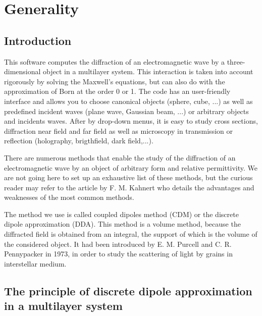 \chapter{Generality}\label{chap1}

\minitoc

\section{Introduction}


This software computes the diffraction of an electromagnetic wave by a
three-dimensional object in a multilayer system. This interaction is
taken into account rigorously by solving the Maxwell's equations, but
can also do with the approximation of Born at the order 0 or 1. The
code has an user-friendly interface and allows you to choose canonical
objects (sphere, cube, ...) as well as predefined incident waves
(plane wave, Gaussian beam, ...) or arbitrary objects and incidents
waves. After by drop-down menus, it is easy to study cross sections,
diffraction near field and far field as well as microscopy in
transmission or reflection (holography, brigthfield, dark field,...).


There are numerous methods that enable the study of the diffraction of
an electromagnetic wave by an object of arbitrary form and relative
permittivity. We are not going here to set up an exhaustive list of
these methods, but the curious reader may refer to the article by
F. M. Kahnert who details the advantages and weaknesses of the most
common methods.~\cite{Kahnert_JQSRT_03} 

The method we use is called coupled dipoles method (CDM) or the
discrete dipole approximation (DDA). This method is a volume method,
because the diffracted field is obtained from an integral, the support
of which is the volume of the considered object.  It had been
introduced by E. M. Purcell and C. R. Pennypacker in 1973, in order to
study the scattering of light by grains in interstellar
medium.~\cite{Purcell_AJ_73} 

\section{The principle of discrete dipole approximation in a multilayer system}


